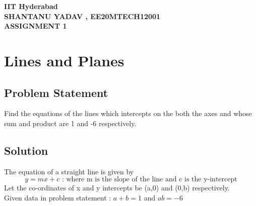 \documentclass[12pt]{article}
\begin{document}
\begin{center}
	{\Large \bf IIT Hyderabad} \\ \vspace{2ex}
	{\large \bf SHANTANU YADAV , EE20MTECH12001 }\\
	\vspace{2ex}
	{\large \bf ASSIGNMENT 1} \\
\end{center}
\vspace{1ex}
\section*{Lines and Planes}
\subsection*{Problem Statement}
Find the equations of the lines which intercepts on the both the axes and whose sum and product are 1 and -6 respectively.
\subsection*{Solution}
The equation of a straight line is given by 
\begin{equation}
y=mx + c           \text{        :  where m is the slope of the line and c is the y-intercept}       
\end{equation}
Let the co-ordinates of x and y intercepts be (a,0) and (0,b) respectively.\\
Given data in problem statement : $ a + b =1 $ and $ ab = -6$ \\
\end{document}
